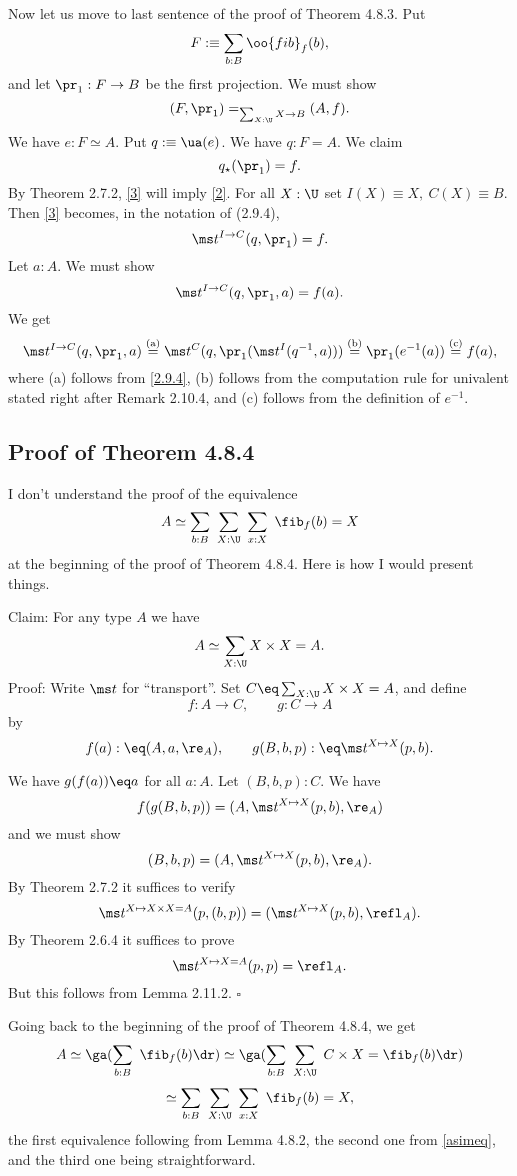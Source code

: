 \documentclass[12pt]{article}
\begin{document}
Now let us move to last sentence of the proof of Theorem 4.8.3. Put
$$
F:\equiv\sum_{b:B}\oo{fib}_f(b),
$$ 
and let $\pr_1:F\to B$ be the first projection. We must show 
\begin{equation}\label{2}
(F,\pr_1)=_{\sum_{X:\U}X\to B}(A,f).
\end{equation} 
We have $e:F\simeq A$. Put $q:\equiv\ua(e)$. We have $q:F=A$. We claim 
\begin{equation}\label{3}
q_\star(\pr_1)=f.
\end{equation} 
By Theorem 2.7.2, \eqref{3} will imply \eqref{2}. For all $X:\U$ set $I(X)\equiv X,\ C(X)\equiv B$. Then \eqref{3} becomes, in the notation of (2.9.4), 
$$
\ms t^{I\to C}(q,\pr_1)=f.
$$ 
Let $a:A$. We must show 
$$
\ms t^{I\to C}(q,\pr_1,a)=f(a).
$$ 
We get 
$$
\ms t^{I\to C}(q,\pr_1,a)\overset{\text{(a)}}=\ms t^C(q,\pr_1(\ms t^I(q^{-1},a)))\overset{\text{(b)}}=\pr_1(e^{-1}(a))\overset{\text{(c)}}=f(a),
$$ 
where (a) follows from \eqref{2.9.4}, (b) follows from the computation rule for univalent stated right after Remark 2.10.4, and (c) follows from the definition of $e^{-1}$.


\subsection{Proof of Theorem 4.8.4}

I don't understand the proof of the equivalence 
$$
A\simeq\sum_{b:B}\ \sum_{X:\U}\ \sum_{x:X}\ \fib_f(b)=X
$$ 
at the beginning of the proof of Theorem 4.8.4. Here is how I would present things. 

\nn Claim: For any type $A$ we have 
\begin{equation}\label{asimeq}
A\simeq\sum_{X:\U}X\times X=A.
\end{equation}
Proof: Write $\ms t$ for ``transport''. Set $C\eq\sum_{X:\U}X\times X=A$, and define 
$$
f:A\to C,\qquad g:C\to A
$$ 
by 
$$
f(a):\eq(A,a,\re_A),\qquad g(B,b,p):\eq\ms t^{X\mapsto X}(p,b).
$$ 

\nn We have $g(f(a))\eq a$ for all $a:A$. Let $(B,b,p):C$. We have 
$$
f(g(B,b,p))=(A,\ms t^{X\mapsto X}(p,b),\re_A)
$$ 
and we must show 
$$
(B,b,p)=(A,\ms t^{X\mapsto X}(p,b),\re_A).
$$
By Theorem 2.7.2 it suffices to verify 
$$
\ms t^{X\mapsto X\times X=A}(p,(b,p))=(\ms t^{X\mapsto X}(p,b),\refl_A).
$$ 
By Theorem 2.6.4 it suffices to prove 
$$
\ms t^{X\mapsto X=A}(p,p)=\refl_A.
$$ 
But this follows from Lemma 2.11.2. $\square$

Going back to the beginning of the proof of Theorem 4.8.4, we get 
$$
A\simeq\ga(\sum_{b:B}\ \fib_f(b)\dr)\simeq\ga(\sum_{b:B}\ \sum_{X:\U}\ C\times X=\fib_f(b)\dr)
$$
$$
\simeq\sum_{b:B}\ \sum_{X:\U}\ \sum_{x:X}\ \fib_f(b)=X,
$$ 
the first equivalence following from Lemma 4.8.2, the second one from \eqref{asimeq}, and the third one being straightforward.
\end{document}
